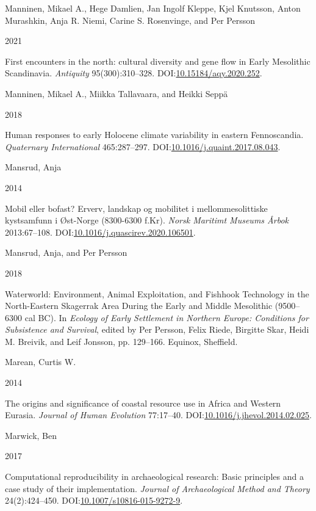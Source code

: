 \documentclass[
  12pt,
  a4paper,
  oneside]{book}
\newlength{\cslhangindent}
\newlength{\csllabelwidth}
\newlength{\cslentryspacingunit} %
\newenvironment{CSLReferences}[2] %
 {%
  \setlength{\parindent}{0pt}
  \ifodd #1
  \let\oldpar\par
  \def\par{\hangindent=\cslhangindent\oldpar}
  \fi
  \setlength{\parskip}{#2\cslentryspacingunit}
 }%
 {}
\newcommand{\CSLBlock}[1]{#1\hfill\break}
\newcommand{\CSLLeftMargin}[1]{\parbox[t]{\csllabelwidth}{#1}}
\newcommand{\CSLRightInline}[1]{\parbox[t]{\linewidth - \csllabelwidth}{#1}\break}
\begin{document}
\begin{CSLReferences}{0}{0}
\leavevmode{}%
\CSLBlock{Manninen, Mikael A., Hege Damlien, Jan Ingolf Kleppe, Kjel Knutsson, Anton Murashkin, Anja R. Niemi, Carine S. Rosenvinge, and Per Persson}
\CSLLeftMargin{ 2021}%
\CSLRightInline{{First encounters in the north: cultural diversity and gene flow in Early Mesolithic Scandinavia}. \emph{Antiquity} 95(300):310--328. DOI:\href{https://doi.org/10.15184/aqy.2020.252}{10.15184/aqy.2020.252}.}

\leavevmode{}%
\CSLBlock{Manninen, Mikael A., Miikka Tallavaara, and Heikki Seppä}
\CSLLeftMargin{ 2018}%
\CSLRightInline{{Human responses to early Holocene climate variability in eastern Fennoscandia}. \emph{Quaternary International} 465:287--297. DOI:\href{https://doi.org/10.1016/j.quaint.2017.08.043}{10.1016/j.quaint.2017.08.043}.}

\leavevmode{}%
\CSLBlock{Mansrud, Anja}
\CSLLeftMargin{ 2014}%
\CSLRightInline{{Mobil eller bofast? Erverv, landskap og mobilitet i mellommesolittiske kystsamfunn i Øst-Norge (8300-6300 f.Kr)}. \emph{Norsk Maritimt Museums Årbok} 2013:67--108. DOI:\href{https://doi.org/10.1016/j.quascirev.2020.106501}{10.1016/j.quascirev.2020.106501}.}

\leavevmode{}%
\CSLBlock{Mansrud, Anja, and Per Persson}
\CSLLeftMargin{ 2018}%
\CSLRightInline{{Waterworld: Environment, Animal Exploitation, and Fishhook Technology in the North-Eastern Skagerrak Area During the Early and Middle Mesolithic (9500--6300 cal BC)}. In \emph{{Ecology of Early Settlement in Northern Europe: Conditions for Subsistence and Survival}}, edited by Per Persson, Felix Riede, Birgitte Skar, Heidi M. Breivik, and Leif Jonsson, pp. 129--166. Equinox, Sheffield.}

\leavevmode{}%
\CSLBlock{Marean, Curtis W.}
\CSLLeftMargin{ 2014}%
\CSLRightInline{The origins and significance of coastal resource use in Africa and Western Eurasia. \emph{Journal of Human Evolution} 77:17--40. DOI:\href{https://doi.org/10.1016/j.jhevol.2014.02.025}{10.1016/j.jhevol.2014.02.025}.}

\leavevmode{}%
\CSLBlock{Marwick, Ben}
\CSLLeftMargin{ 2017}%
\CSLRightInline{Computational reproducibility in archaeological research: Basic principles and a case study of their implementation. \emph{Journal of Archaeological Method and Theory} 24(2):424--450. DOI:\href{https://doi.org/10.1007/s10816-015-9272-9}{10.1007/s10816-015-9272-9}.}


\end{CSLReferences}
\end{document}

